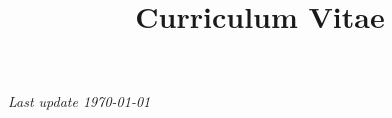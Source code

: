 \documentclass[12pt, letterpaper, sans, unicode]{moderncv}
\title{Curriculum Vitae}
\begin{document}
    \makecvtitle

    

    

    

    
    
    

    
    
    

    
    
    
    
    
    
    
    
    

    

    \emptysection{}\closesection
    \vfill
    \begin{center}
    \textit{\small Last update \today}
    \end{center}
\end{document}
